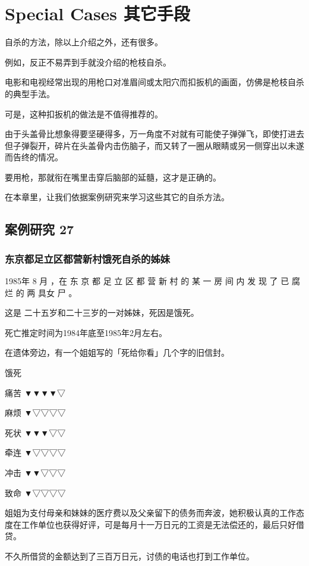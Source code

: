 \documentclass[UTF8]{ctexart}
\begin{document}
\newpage

\section{Special Cases 其它手段}

自杀的方法，除以上介绍之外，还有很多。

例如，反正不易弄到手就没介绍的枪枝自杀。

电影和电视经常出现的用枪口对准眉间或太阳穴而扣扳机的画面，仿佛是枪枝自杀的典型手法。

可是，这种扣扳机的做法是不值得推荐的。

由于头盖骨比想象得要坚硬得多，万一角度不对就有可能使子弹弹飞，即使打进去但子弹裂开，碎片在头盖骨内击伤脑子，而又转了一圈从眼睛或另一侧穿出以未遂而告终的情况。

要用枪，那就衔在嘴里击穿后脑部的延髓，这才是正确的。

在本章里，让我们依据案例研究来学习这些其它的自杀方法。



\subsection{案例研究 27}

\subsubsection*{东京都足立区都营新村饿死自杀的姊妹}

1985年 8 月 ，在 东 京 都 足 立 区 都 营 新 村 的 某 一 房 间 内 发 现 了 已 腐 烂 的 两 具女 尸 。

这是 二十五岁和二十三岁的一对姊妹，死因是饿死。

死亡推定时间为1984年底至1985年2月左右。

在遗体旁边，有一个姐姐写的「死给你看」几个字的旧信封。

饿死

痛苦 ▼▼▼▼▽

麻烦 ▼▽▽▽▽

死状 ▼▼▼▽▽

牵连 ▼▽▽▽▽

冲击 ▼▼▽▽▽

致命 ▼▽▽▽▽

姐姐为支付母亲和妹妹的医疗费以及父亲留下的债务而奔波，她积极认真的工作态度在工作单位也获得好评，可是每月十一万日元的工资是无法偿还的，最后只好借贷。

不久所借贷的金额达到了三百万日元，讨债的电话也打到工作单位。
\end{document}
